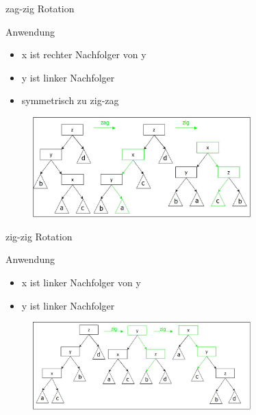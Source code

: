 \documentclass[11pt]{beamer}
\begin{document}
	
	\begin{frame}{zag-zig  Rotation}
	\begin{block}{Anwendung}
		\begin{itemize}
			\item x ist rechter Nachfolger von y
			\item y ist linker Nachfolger
			\item symmetrisch zu zig-zag
		\end{itemize}	
	\end{block}
	\pause
	\begin{figure}[h]
		\centering
		\includegraphics[width=0.75\textwidth]{"bilder/zagzigRotation"}
	\end{figure}

	\end{frame}	
	
		\begin{frame}{zig-zig  Rotation}
		\begin{block}{Anwendung}
			\begin{itemize}
				\item x ist linker Nachfolger von y
				\item y ist linker Nachfolger
			\end{itemize}
		\end{block}
		\pause
		\begin{figure}[h]
			\centering
			\includegraphics[width=0.75\textwidth]{"bilder/zigzigRotation"}
		\end{figure}
	\end{frame}
	
\end{document}
